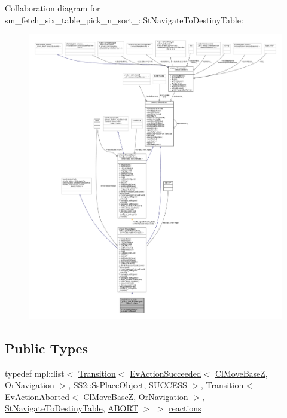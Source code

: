 Collaboration diagram for sm\+\_\+fetch\+\_\+six\+\_\+table\+\_\+pick\+\_\+n\+\_\+sort\+\_\+:\+:St\+Navigate\+To\+Destiny\+Table\+:
\nopagebreak
\begin{figure}[H]
\begin{center}
\leavevmode
\includegraphics[width=350pt]{structsm__fetch__six__table__pick__n__sort__1_1_1StNavigateToDestinyTable__coll__graph}
\end{center}
\end{figure}
\subsection*{Public Types}
\begin{DoxyCompactItemize}
\item 
typedef mpl\+::list$<$ \hyperlink{classsmacc_1_1Transition}{Transition}$<$ \hyperlink{structsmacc_1_1default__events_1_1EvActionSucceeded}{Ev\+Action\+Succeeded}$<$ \hyperlink{classcl__move__base__z_1_1ClMoveBaseZ}{Cl\+Move\+BaseZ}, \hyperlink{classsm__fetch__six__table__pick__n__sort__1_1_1OrNavigation}{Or\+Navigation} $>$, \hyperlink{structsm__fetch__six__table__pick__n__sort__1_1_1SS2_1_1SsPlaceObject}{S\+S2\+::\+Ss\+Place\+Object}, \hyperlink{structsmacc_1_1default__transition__tags_1_1SUCCESS}{S\+U\+C\+C\+E\+SS} $>$, \hyperlink{classsmacc_1_1Transition}{Transition}$<$ \hyperlink{structsmacc_1_1default__events_1_1EvActionAborted}{Ev\+Action\+Aborted}$<$ \hyperlink{classcl__move__base__z_1_1ClMoveBaseZ}{Cl\+Move\+BaseZ}, \hyperlink{classsm__fetch__six__table__pick__n__sort__1_1_1OrNavigation}{Or\+Navigation} $>$, \hyperlink{structsm__fetch__six__table__pick__n__sort__1_1_1StNavigateToDestinyTable}{St\+Navigate\+To\+Destiny\+Table}, \hyperlink{structsmacc_1_1default__transition__tags_1_1ABORT}{A\+B\+O\+RT} $>$ $>$ \hyperlink{structsm__fetch__six__table__pick__n__sort__1_1_1StNavigateToDestinyTable_af03fcd03ff9b2c4288e00548642fa64c}{reactions}
\end{DoxyCompactItemize}

